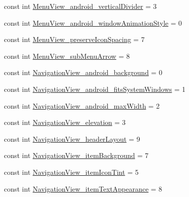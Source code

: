 \begin{DoxyCompactItemize}
\item 
const int \mbox{\hyperlink{class_f_w_p_s___app_1_1_droid_1_1_resource_1_1_styleable_ab1f9cf1cf8e08f07682b54e9f140e4d4}{Menu\+View\+\_\+android\+\_\+vertical\+Divider}} = 3
\item 
const int \mbox{\hyperlink{class_f_w_p_s___app_1_1_droid_1_1_resource_1_1_styleable_a03c99fc27656b4eaa34f2c8d067d18b6}{Menu\+View\+\_\+android\+\_\+window\+Animation\+Style}} = 0
\item 
const int \mbox{\hyperlink{class_f_w_p_s___app_1_1_droid_1_1_resource_1_1_styleable_a80edba170a641cdfeac57022aae8197e}{Menu\+View\+\_\+preserve\+Icon\+Spacing}} = 7
\item 
const int \mbox{\hyperlink{class_f_w_p_s___app_1_1_droid_1_1_resource_1_1_styleable_afca08b64e4d6e243055a2589a6c51a5a}{Menu\+View\+\_\+sub\+Menu\+Arrow}} = 8
\item 
const int \mbox{\hyperlink{class_f_w_p_s___app_1_1_droid_1_1_resource_1_1_styleable_a1b99010df664e88e5b45101774fe296a}{Navigation\+View\+\_\+android\+\_\+background}} = 0
\item 
const int \mbox{\hyperlink{class_f_w_p_s___app_1_1_droid_1_1_resource_1_1_styleable_afcb849111a9e7f951d9a81cd8ba7a15e}{Navigation\+View\+\_\+android\+\_\+fits\+System\+Windows}} = 1
\item 
const int \mbox{\hyperlink{class_f_w_p_s___app_1_1_droid_1_1_resource_1_1_styleable_a7648d09c2ecffac132593b2a34bffded}{Navigation\+View\+\_\+android\+\_\+max\+Width}} = 2
\item 
const int \mbox{\hyperlink{class_f_w_p_s___app_1_1_droid_1_1_resource_1_1_styleable_adaf97794bea8f10f8468a5bfc256a1eb}{Navigation\+View\+\_\+elevation}} = 3
\item 
const int \mbox{\hyperlink{class_f_w_p_s___app_1_1_droid_1_1_resource_1_1_styleable_abacd41e862de5b9922388442050a0ccf}{Navigation\+View\+\_\+header\+Layout}} = 9
\item 
const int \mbox{\hyperlink{class_f_w_p_s___app_1_1_droid_1_1_resource_1_1_styleable_a32d16a6f5b116f3a28027de19cc713e2}{Navigation\+View\+\_\+item\+Background}} = 7
\item 
const int \mbox{\hyperlink{class_f_w_p_s___app_1_1_droid_1_1_resource_1_1_styleable_a8bfe2a206540ac5b16dd728c2f8d9cea}{Navigation\+View\+\_\+item\+Icon\+Tint}} = 5
\item 
const int \mbox{\hyperlink{class_f_w_p_s___app_1_1_droid_1_1_resource_1_1_styleable_afee218564c3c154d4d6e4b2f24e33991}{Navigation\+View\+\_\+item\+Text\+Appearance}} = 8
\item 

\end{DoxyCompactItemize}
